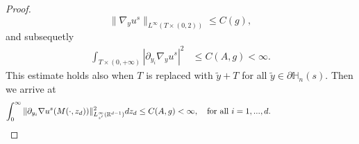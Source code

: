 \documentclass[11pt, reqno]{amsart}
\theoremstyle{definition}
\theoremstyle{remark}
\numberwithin{equation}{section}
\begin{document}
\begin{appendices}
\begin{proof}
	\begin{equation}
		\| \nabla_y u^s \|_{L^{\infty}(T\times (0,2))} \leq  C(g),
	\end{equation}
	and subsequetly
	\begin{align*}
		\int_{T\times (0,+\infty)}|\partial_{y_i} \nabla_y u^s|^2
		&\leq C(A,g)<\infty.
	\end{align*}
	This estimate holds also when $T$ is replaced with $\tilde{y} + T$ for all  $\tilde{y} \in \partial\mathbb{H}_n(s)$. Then we arrive at 
	\begin{align*}
		\int_{0}^\infty  \|\partial_{y_i}  \nabla u^s(M (\cdot,z_d))\|^2_{L_{z'}^\infty(\mathbb{R}^{d-1})} dz_d\leq C(A,g)<\infty,\quad \mbox{for all } i=1,...,d.\qquad \qquad \qquad\qquad \qquad \qedhere
	\end{align*}
\end{proof}



\end{appendices}
\end{document}
